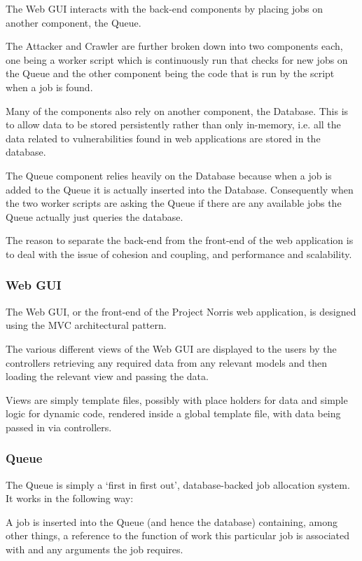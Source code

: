 \documentclass[12pt,a4paper]{article}
\begin{document}
The Web GUI interacts with the back-end components by placing jobs on another component, the Queue.

The Attacker and Crawler are further broken down into two components each, one being a worker script which is continuously run that checks for new jobs on the Queue and the other component being the code that is run by the script when a job is found.

Many of the components also rely on another component, the Database. This is to allow data to be stored persistently rather than only in-memory, i.e. all the data related to vulnerabilities found in web applications are stored in the database.

The Queue component relies heavily on the Database because when a job is added to the Queue it is actually inserted into the Database.  Consequently when the two worker scripts are asking the Queue if there are any available jobs the Queue actually just queries the database.

The reason to separate the back-end from the front-end of the web application is to deal with the issue of cohesion and coupling, and performance and scalability. 

\subsubsection{Web GUI}
The Web GUI, or the front-end of the Project Norris web application, is designed using the MVC architectural pattern.

The various different views of the Web GUI are displayed to the users by the controllers retrieving any required data from any relevant models and then loading the relevant view and passing the data.

Views are simply template files, possibly with place holders for data and simple logic for dynamic code, rendered inside a global template file, with data being passed in via controllers.

\subsubsection{Queue}
The Queue is simply a `first in first out', database-backed job allocation system.  It works in the following way:

A job is inserted into the Queue (and hence the database) containing, among other things, a reference to the function of work this particular job is associated with and any arguments the job requires.
\end{document}
